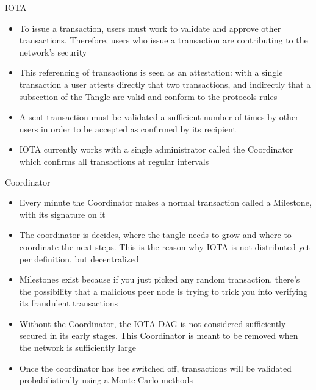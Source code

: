 \documentclass[9pt]{beamer}
\begin{document}

\begin{frame}{IOTA}
	\begin{itemize}
		\item To issue a transaction, users must work to validate and approve other transactions. Therefore, users who issue a transaction are contributing to the network's security
		\item This referencing of transactions is seen as an attestation: with a single transaction a user attests directly that two transactions, and indirectly that a subsection of the Tangle are valid and conform to the protocols rules
		\item A sent transaction must be validated a sufficient number of times by other users in order to be accepted as confirmed by its recipient
		\item IOTA currently works with a single administrator called the Coordinator which confirms all transactions at regular intervals
	\end{itemize}
\end{frame}


\begin{frame}{Coordinator}
	\begin{itemize}
		\item Every minute the Coordinator makes a normal transaction called a Milestone, with its signature on it
		\item The coordinator is decides, where the tangle needs to grow and where to coordinate the next steps. This is the reason why IOTA is not distributed yet per definition, but decentralized
		\item Milestones exist because if you just picked any random transaction, there's the possibility that a malicious peer node is trying to trick you into verifying its fraudulent transactions
		\item Without the Coordinator, the IOTA DAG is not considered sufficiently secured in its early stages. This Coordinator is meant to be removed when the network is sufficiently large
		\item Once the coordinator has bee switched off, transactions will be validated probabilistically using a Monte-Carlo methods
	\end{itemize}
\end{frame}
\end{document}
